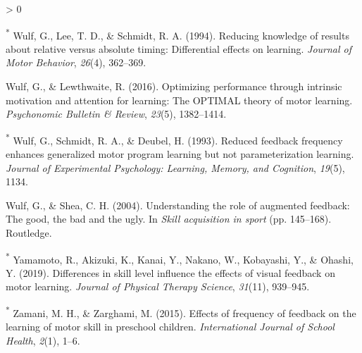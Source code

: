 \documentclass[
  english,
  man, donotrepeattitle,floatsintext]{apa7}
\newlength{\cslhangindent}
\newenvironment{CSLReferences}[2] %
 {%
  \setlength{\parindent}{0pt}
  \ifodd #1 \everypar{\setlength{\hangindent}{\cslhangindent}}\ignorespaces\fi
  \ifnum #2 > 0
  \setlength{\parskip}{#2\baselineskip}
  \fi
 }%
 {}
\begin{document}
\begin{CSLReferences}{1}{0}
\leavevmode\hypertarget{ref-Wulf1994}{}%
\textsuperscript{*} Wulf, G., Lee, T. D., \& Schmidt, R. A. (1994). Reducing knowledge of results about relative versus absolute timing: Differential effects on learning. \emph{Journal of Motor Behavior}, \emph{26}(4), 362--369.

\leavevmode\hypertarget{ref-Wulf2016}{}%
Wulf, G., \& Lewthwaite, R. (2016). Optimizing performance through intrinsic motivation and attention for learning: The OPTIMAL theory of motor learning. \emph{Psychonomic Bulletin \& Review}, \emph{23}(5), 1382--1414.

\leavevmode\hypertarget{ref-Wulf1993}{}%
\textsuperscript{*} Wulf, G., Schmidt, R. A., \& Deubel, H. (1993). Reduced feedback frequency enhances generalized motor program learning but not parameterization learning. \emph{Journal of Experimental Psychology: Learning, Memory, and Cognition}, \emph{19}(5), 1134.

\leavevmode\hypertarget{ref-Wulf2004}{}%
Wulf, G., \& Shea, C. H. (2004). Understanding the role of augmented feedback: The good, the bad and the ugly. In \emph{Skill acquisition in sport} (pp. 145--168). Routledge.

\leavevmode\hypertarget{ref-Yamamoto2019}{}%
\textsuperscript{*} Yamamoto, R., Akizuki, K., Kanai, Y., Nakano, W., Kobayashi, Y., \& Ohashi, Y. (2019). Differences in skill level influence the effects of visual feedback on motor learning. \emph{Journal of Physical Therapy Science}, \emph{31}(11), 939--945.

\leavevmode\hypertarget{ref-Zamani2015}{}%
\textsuperscript{*} Zamani, M. H., \& Zarghami, M. (2015). Effects of frequency of feedback on the learning of motor skill in preschool children. \emph{International Journal of School Health}, \emph{2}(1), 1--6.

\end{CSLReferences}
\end{document}
